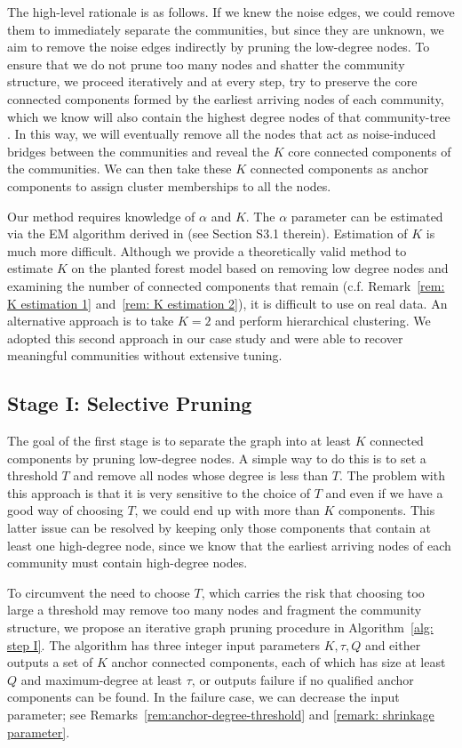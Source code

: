 \documentclass[twoside,11pt]{article}
\theoremstyle{remark}
\begin{document}
The high-level rationale is as follows. If we knew the noise edges, we could remove them to immediately separate the communities, but since they are unknown, we aim to remove the noise edges indirectly by pruning the low-degree nodes. To ensure that we do not prune too many nodes and shatter the community structure, we proceed iteratively and at every step, try to preserve the core connected components formed by the earliest arriving nodes of each community, which we know will also contain the highest degree nodes of that community-tree \citep{senizergues2021geometry, contat2024eve}. In this way, we will eventually remove all the nodes that act as noise-induced bridges between the communities and reveal the $K$ core connected components of the communities. We can then take these $K$ connected components as anchor components to assign cluster memberships to all the nodes.

Our method requires knowledge of $\alpha$ and $K$. The $\alpha$ parameter can be estimated via the EM algorithm derived in \cite{crane2024root} (see Section S3.1 therein). Estimation of $K$ is much more difficult. Although we provide a theoretically valid method to estimate $K$ on the planted forest model based on removing low degree nodes and examining the number of connected components that remain (c.f. Remark~\ref{rem: K estimation 1} and~\ref{rem: K estimation 2}), it is difficult to use on real data. An alternative approach is to take $K=2$ and perform hierarchical clustering. We adopted this second approach in our case study and were able to recover meaningful communities without extensive tuning. 


\subsection{Stage I: Selective Pruning}

The goal of the first stage is to separate the graph into at least $K$ connected components by pruning low-degree nodes. A simple way to do this is to set a threshold $T$ and remove all nodes whose degree is less than $T$. The problem with this approach is that it is very sensitive to the choice of $T$ and even if we have a good way of choosing $T$, we could end up with more than $K$ components. This latter issue can be resolved by keeping only those components that contain at least one high-degree node, since we know that the earliest arriving nodes of each community must contain high-degree nodes. 

To circumvent the need to choose $T$, which carries the risk that choosing too large a threshold may remove too many nodes and fragment the community structure, we propose an iterative graph pruning procedure in Algorithm~\ref{alg: step I}. The algorithm has three integer input parameters $K, \tau, Q$ and either outputs a set of $K$ anchor connected components, each of which has size at least $Q$ and maximum-degree at least $\tau$, or outputs failure if no qualified anchor components can be found. In the failure case, we can decrease the input parameter; see Remarks~\ref{rem:anchor-degree-threshold} and \ref{remark: shrinkage parameter}. 
\end{document}
